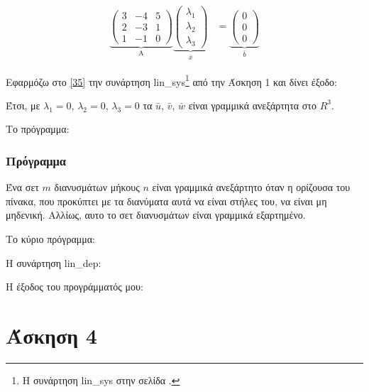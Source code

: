 \documentclass[12pt, fleqn, leqno]{extreport}
\begin{document}
\begin{equation}
    \begin{aligned}%
        \underbrace{
            \begin{pmatrix}
                3 & -4 & 5 \\
                2 & -3 & 1 \\
                1 & -1 & 0
            \end{pmatrix}
        }_\text{A}
        \underbrace{
            \begin{pmatrix}
                \lambda_{1} \\
                \lambda_{2} \\
                \lambda_{3}
            \end{pmatrix}
        }_\text{$\bar{x}$}
         & =
        \underbrace{
            \begin{pmatrix}
                0 \\
                0 \\
                0
            \end{pmatrix}
        }_\text{$\bar{b}$}
    \end{aligned}\label{35}
\end{equation}

Εφαρμόζω στο \eqref{35} την συνάρτηση lin\_sys\footnote{Η συνάρτηση lin\_sys στην σελίδα \pageref{lin_sys}.} από την Άσκηση 1 και δίνει έξοδο:

Έτσι, με $\lambda_{1} = 0$, $\lambda_{2} = 0$, $\lambda_{3} = 0$ τα $\bar{u}$, $\bar{v}$, $\bar{w}$ είναι γραμμικά ανεξάρτητα στο $R^{3}$.

Το πρόγραμμα:

\newpage

\subsection{Πρόγραμμα}

Ένα σετ $m$ διανυσμάτων μήκους $n$ είναι γραμμικά ανεξάρτητο όταν η ορίζουσα του πίνακα, που προκύπτει με τα διανύματα αυτά να είναι στήλες του, να είναι μη μηδενική. Αλλίως, αυτο το σετ διανυσμάτων είναι γραμμικά εξαρτημένο.

Το κύριο πρόγραμμα:


Η συνάρτηση lin\_dep:


Η έξοδος του προγράμματός μου:


\chapter{Άσκηση 4}
\end{document}
